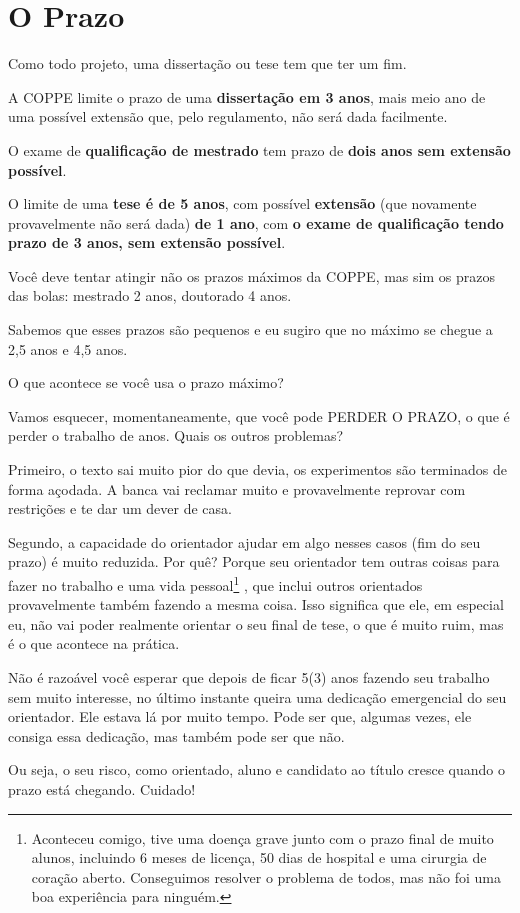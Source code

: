 \chapter{O Prazo}

Como todo projeto, uma dissertação ou tese tem que ter um fim.

A COPPE limite o prazo de uma \textbf{dissertação em 3 anos}, mais meio ano de uma possível extensão que, pelo regulamento, não será dada facilmente.

O exame de \textbf{qualificação de mestrado} tem prazo de \textbf{dois anos sem extensão possível}.

O limite de uma \textbf{tese é de 5 anos}, com possível \textbf{extensão} (que novamente provavelmente não será dada) \textbf{de 1 ano}, com \textbf{o exame de qualificação tendo prazo de 3 anos, sem extensão possível}.

Você deve tentar atingir não os prazos máximos da COPPE, mas sim os prazos das bolas: mestrado 2 anos, doutorado 4 anos.

Sabemos que esses prazos são pequenos e eu sugiro que no máximo se chegue a 2,5 anos e 4,5 anos.

O que acontece se você usa o prazo máximo?

Vamos esquecer, momentaneamente, que você pode PERDER O PRAZO, o que é perder o trabalho de anos. Quais os outros problemas?

Primeiro, o texto sai muito pior do que devia, os experimentos são terminados de forma açodada. A banca vai reclamar muito e provavelmente reprovar com restrições e te dar um dever de casa.

Segundo, a capacidade do orientador ajudar em algo nesses casos (fim do seu prazo) é muito reduzida. Por quê? Porque seu orientador tem outras coisas para fazer no trabalho e uma vida pessoal\footnote{Aconteceu comigo, tive uma doença grave junto com o prazo final de muito alunos, incluindo 6 meses de licença, 50  dias de hospital e uma cirurgia de coração aberto. Conseguimos resolver o problema de todos, mas não foi uma boa experiência para ninguém. } , que inclui outros orientados provavelmente também fazendo a mesma coisa. Isso significa que ele, em especial eu, não vai poder realmente orientar o seu final de tese, o que é muito ruim, mas é o que acontece na prática.

Não é razoável você esperar que depois de ficar 5(3) anos fazendo seu trabalho sem muito interesse, no último instante queira uma dedicação emergencial do seu orientador. Ele estava lá por muito tempo. Pode ser que, algumas vezes, ele consiga essa dedicação, mas também pode ser que não.

Ou seja, o seu risco, como orientado, aluno e candidato ao título cresce quando o prazo está chegando. Cuidado!
